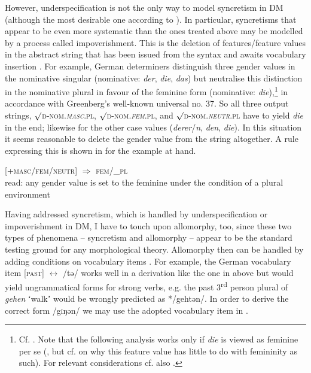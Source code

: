 \documentclass[output=paper]{langsci/langscibook}
\begin{document}
However, underspecification is not the only way to model syncretism in DM (although the most desirable one according to \citealt[253]{Harley2008}). In particular, syncretisms that appear to be even more systematic than the ones treated above may be modelled by a process called impoverishment. This is the deletion of features/feature values in the abstract string that has been issued from the syntax and awaits vocabulary insertion \citep[139]{Embick2015}. For example, German determiners distinguish three gender values in the nominative singular (nominative: \textit{der}, \textit{die}, \textit{das}) but neutralise this distinction in the nominative plural in favour of the feminine form (nominative: \textit{die}),\footnote{Cf. \citet[214]{HelbigHelbig2001}. Note that the following analysis works only if \textit{die} is viewed as feminine per se (\citealt{Meinunger2017}, but cf. \citealt[291--292]{Leiss1994} on why this feature value has little to do with femininity as such). For relevant considerations cf. also \citet[184]{Kramer2019}.} in accordance with Greenberg’s well-known universal no. 37. So all three output strings, ${\surd}$\textsc{d}-\textsc{nom}.\textit{\textsc{masc}}.\textsc{pl}, ${\surd}$\textsc{d}-\textsc{nom}.\textit{\textsc{fem}}.\textsc{pl}, and ${\surd}$\textsc{d}-\textsc{nom}.\textit{\textsc{neutr}}.\textsc{pl} have to yield \textit{die} in the end; likewise for the other case values (\textit{derer}/\textit{n}, \textit{den}, \textit{die}). In this situation it seems reasonable to delete the gender value from the string altogether. A rule expressing this is shown in  for the example at hand.

\ea \label{ex:reiner:17} 
[+\textsc{masc}/\textsc{fem}/\textsc{neutr}] ${\Rightarrow}$ \textsc{fem}/\_\textsc{pl}\\
read: any gender value is set to the feminine under the condition of a plural environment
\z

Having addressed syncretism, which is handled by underspecification or impoverishment in DM, I have to touch upon allomorphy, too, since these two types of phenomena – syncretism and allomorphy – appear to be the standard testing ground for any morphological theory. Allomorphy then can be handled by adding conditions on vocabulary items \citep[169]{Embick2015}. For example, the German vocabulary item [\textsc{past}] $\leftrightarrow $ /tə/ works well in a derivation like the one in  above but would yield ungrammatical forms for strong verbs, e.g. the past 3\textsuperscript{rd} person plural of \textit{gehen} ʻwalkʼ would be wrongly predicted as */gehtən/. In order to derive the correct form /g\textsc{i}ŋən/ we may use the adopted vocabulary item in .
\end{document}
